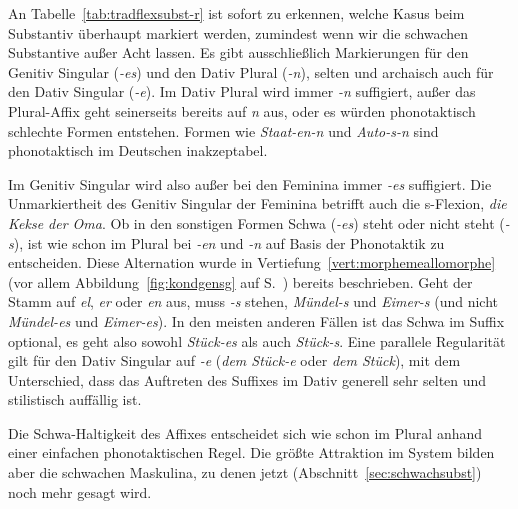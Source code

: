 An Tabelle~\ref{tab:tradflexsubst-r} ist sofort zu erkennen, welche Kasus beim Substantiv überhaupt markiert werden, zumindest wenn wir die schwachen Substantive außer Acht lassen.
Es gibt ausschließlich Markierungen für den Genitiv Singular (\textit{-es}) und den Dativ Plural (\textit{-n}), selten und archaisch auch für den Dativ Singular (\textit{-e}).
Im Dativ Plural wird immer \textit{-n} suffigiert, außer das Plural-Affix geht seinerseits bereits auf \textit{n} aus, oder es würden phonotaktisch schlechte Formen entstehen.
Formen wie \textit{\Ast Staat-en-n} und \textit{\Ast Auto-s-n} sind phonotaktisch im Deutschen inakzeptabel.

Im Genitiv Singular wird also außer bei den Feminina immer \textit{-es} suffigiert.
Die Unmarkiertheit des Genitiv Singular der Feminina betrifft auch die s-Flexion, \zB \textit{die Kekse der Oma}.
Ob in den sonstigen Formen Schwa (\textit{-es}) steht oder nicht steht (\textit{-s}), ist wie schon im Plural bei \textit{-en} und \textit{-n} auf Basis der Phonotaktik zu entscheiden.
Diese Alternation wurde in Vertiefung~\ref{vert:morphemeallomorphe} (vor allem Abbildung~\ref{fig:kondgensg} auf S.~\pageref{fig:kondgensg}) bereits beschrieben.
Geht der Stamm auf \textit{el}, \textit{er} oder \textit{en} aus, muss \textit{-s} stehen, \zB \textit{Mündel-s} und \textit{Eimer-s} (und nicht \textit{\Ast Mündel-es} und \textit{\Ast Eimer-es}).
In den meisten anderen Fällen ist das Schwa im Suffix optional, es geht also sowohl \textit{Stück-es} als auch \textit{Stück-s}.
Eine parallele Regularität gilt für den Dativ Singular auf \textit{-e} (\textit{dem Stück-e} oder \textit{dem Stück}), mit dem Unterschied, dass das Auftreten des Suffixes im Dativ generell sehr selten und stilistisch auffällig ist.


Die Schwa-Haltigkeit des Affixes entscheidet sich wie schon im Plural anhand einer einfachen phonotaktischen Regel.
Die größte Attraktion im System bilden aber die schwachen Maskulina, zu denen jetzt (Abschnitt~\ref{sec:schwachsubst}) noch mehr gesagt wird.

